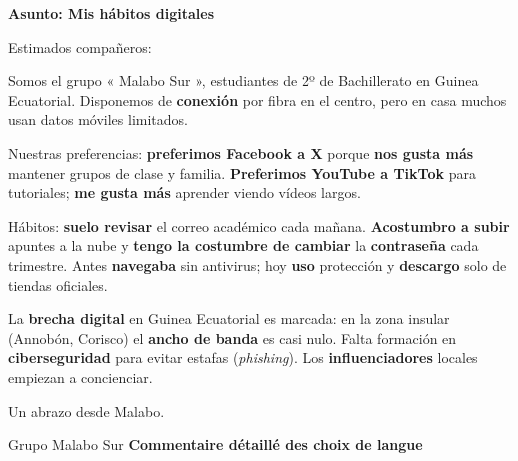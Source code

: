 \documentclass[11pt]{article}
\begin{document}
\begin{exoresolu}
\textbf{Asunto: Mis hábitos digitales}

Estimados compañeros:

Somos el grupo « Malabo Sur », estudiantes de 2º de Bachillerato en Guinea Ecuatorial. Disponemos de \textbf{conexión} por fibra en el centro, pero en casa muchos usan datos móviles limitados.

Nuestras preferencias: \textbf{preferimos Facebook a X} porque \textbf{nos gusta más} mantener grupos de clase y familia. \textbf{Preferimos YouTube a TikTok} para tutoriales; \textbf{me gusta más} aprender viendo vídeos largos.

Hábitos: \textbf{suelo revisar} el correo académico cada mañana. \textbf{Acostumbro a subir} apuntes a la nube y \textbf{tengo la costumbre de cambiar} la \textbf{contraseña} cada trimestre. Antes \textbf{navegaba} sin antivirus; hoy \textbf{uso} protección y \textbf{descargo} solo de tiendas oficiales.

La \textbf{brecha digital} en Guinea Ecuatorial es marcada: en la zona insular (Annobón, Corisco) el \textbf{ancho de banda} es casi nulo. Falta formación en \textbf{ciberseguridad} para evitar estafas (\emph{phishing}). Los \textbf{influenciadores} locales empiezan a concienciar.

Un abrazo desde Malabo.

Grupo Malabo Sur
\tcblower
\textbf{Commentaire détaillé des choix de langue}


\end{exoresolu}
\end{document}
